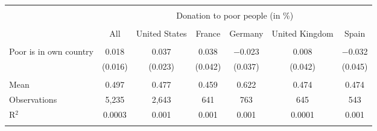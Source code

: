 
\begin{tabular}{@{\extracolsep{5pt}}lcccccc} 
\\[-1.8ex]\hline 
\hline \\[-1.8ex] 
 & \multicolumn{6}{c}{Donation to poor people (in \%)} \\ 
\cline{2-7} 
\\[-1.8ex] & All & United States & France & Germany & United Kingdom & Spain \\ 
\hline \\[-1.8ex] 
 Poor is in own country & 0.018 & 0.037 & 0.038 & $-$0.023 & 0.008 & $-$0.032 \\ 
  & (0.016) & (0.023) & (0.042) & (0.037) & (0.042) & (0.045) \\ 
 \hline \\[-1.8ex] 
Mean & 0.497 & 0.477 & 0.459 & 0.622 & 0.474 & 0.474 \\ 
Observations & 5,235 & 2,643 & 641 & 763 & 645 & 543 \\ 
R$^{2}$ & 0.0003 & 0.001 & 0.001 & 0.001 & 0.0001 & 0.001 \\ 
\hline 
\hline \\[-1.8ex] 
\end{tabular} 